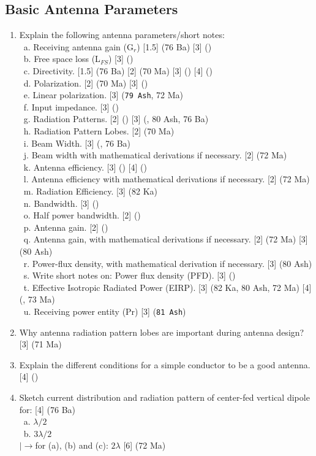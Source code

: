 \documentclass[12pt]{article}
\newcommand{\lb}{\\$\left|\rightarrow\right.$}
\newcommand{\enter}{\\\textcolor{white}{1}}
\begin{document}
  \subsection{Basic Antenna Parameters}
    \begin{enumerate}
      \item Explain the following antenna parameters/short notes:
        \enter a. Receiving antenna gain (G$_r$) \hfill [1.5] (76 Ba) [3] ()
        \enter b. Free space loss (L$_{FS}$) \hfill [3] ()
        \enter c. Directivity. \hfill [1.5] (76 Ba) [2] (70 Ma) [3] () [4] ()
        \enter d. Polarization. \hfill [2] (70 Ma) [3] ()
        \enter e. Linear polarization. \hfill [3] (\texttt{79 Ash}, 72 Ma)
        \enter f. Input impedance. \hfill [3] ()
        \enter g. Radiation Patterns. \hfill [2] () [3] (, 80 Ash, 76 Ba)
        \enter h. Radiation Pattern Lobes. \hfill [2] (70 Ma)
        \enter i. Beam Width. \hfill [3] (, 76 Ba)
        \enter j. Beam width with mathematical derivations if necessary. \hfill [2] (72 Ma)
        \enter k. Antenna efficiency. \hfill [3] () [4] ()
        \enter l. Antenna efficiency with mathematical derivations if necessary. \hfill [2] (72 Ma)
        \enter m. Radiation Efficiency. \hfill [3] (82 Ka)
        \enter n. Bandwidth. \hfill [3] ()
        \enter o. Half power bandwidth. \hfill [2] ()
        \enter p. Antenna gain. \hfill [2] ()
        \enter q. Antenna gain, with mathematical derivations if necessary. \hfill [2] (72 Ma) [3] (80 Ash)
        \enter r. Power-flux density, with mathematical derivation if necessary. \hfill [3] (80 Ash)
        \enter s. Write short notes on: Power flux density (PFD). \hfill [3] ()
        \enter t. Effective Isotropic Radiated Power (EIRP). \hfill [3] (82 Ka, 80 Ash, 72 Ma) [4] (, 73 Ma)
        \enter u. Receiving power entity (Pr) \hfill [3] (\texttt{81 Ash})

      \item Why antenna radiation pattern lobes are important during antenna design? \hfill [3] (71 Ma)

      \item Explain the different conditions for a simple conductor to be a good antenna. \hfill [4] ()

      \item Sketch current distribution and radiation pattern of center-fed vertical dipole for: \hfill [4] (76 Ba)
        \enter a. $\lambda/2$  
        \enter b. $3\lambda/2$  
        \lb for (a), (b) and (c): $2\lambda$ \hfill [6] (72 Ma)


\end{enumerate}
\end{document}
